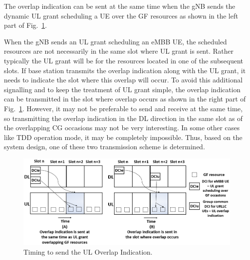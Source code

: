 \documentclass[conference]{IEEEtran}
\begin{document}
The overlap indication can be sent at the same time when the gNB sends the dynamic UL grant scheduling a UE over the GF resources as shown in the left part of Fig.~\ref{fig4}.

When the gNB sends an UL grant scheduling an eMBB UE, the scheduled resources are not necessarily in the same slot where UL grant is sent. Rather typically the UL grant will be for the resources located in one of the subsequent slots. If base station transmits the overlap indication along with the UL grant, it needs to indicate the slot where this overlap will occur. To avoid this additional signalling and to keep the treatment of UL grant simple, the overlap indication can be transmitted in the slot where overlap occurs as shown in the right part of Fig.~\ref{fig4}. However, it may not be preferable to send and receive at the same time, so transmitting the overlap indication in the DL direction in the same slot as of the overlapping CG occasions may not be very interesting. In some other cases like TDD operation mode, it may be completely impossible. Thus, based on the system design, one of these two transmission scheme is determined.

\begin{figure}[htbp]
\centerline{\includegraphics[scale=0.24]{fig4.PNG}}
\caption{Timing to send the UL Overlap Indication.}
\label{fig4}
\vspace{-4mm}
\end{figure}
\end{document}
